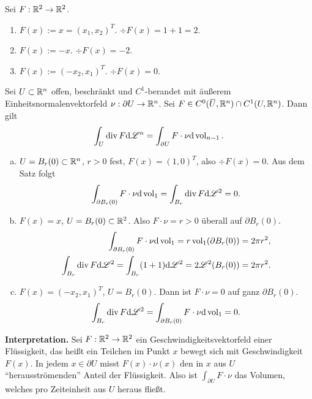 \begin{exmp} Sei $F: \mathbb{R}^2 \to \mathbb{R}^2$.
 \begin{enumerate}
  \item $F(x) := x = (x_1, x_2)^T$. $\div F(x) = 1 + 1 = 2.$
  \item $F(x) := -x$. $\div F(x) = -2$.
  \item $F(x) := (-x_2, x_1)^T$. $\div F(x) = 0$.
 \end{enumerate}
\end{exmp}

\begin{thm}[Divergenzsatz]
 Sei $U \subset \mathbb{R}^n$ offen, beschränkt und $C^1$-berandet mit äußerem Einheitsnormalenvektorfeld $\nu: \partial U \to \mathbb{R}^n$. Sei $F \in C^0( \obar{U}, \real^n ) \cap C^1( U, \real^n)$. Dann gilt
 \[ \int_U \operatorname{div} F \mathrm{d} \mathscr{L}^n = \int_{\partial U} F \cdot \nu \mathrm{d} \operatorname{vol}_{n-1}. \]
\end{thm}

\begin{exmp}
 \begin{enumerate}[a)]
  \item $U = B_r(0) \subset \mathbb{R}^n$, $r > 0$ fest, $F(x) = (1,0)^T$, also $\div F(x) = 0$. Aus dem Satz folgt
  \[ \int_{\partial B_r(0)} F \cdot \nu \mathrm{d} \operatorname{vol}_1 = \int_{B_r} \operatorname{div} F \mathrm{d} \mathscr{L}^2 = 0. \]
  \item $F(x) = x$, $U = B_r(0) \subset \mathbb{R}^2$. Also $F \cdot \nu = r > 0$ überall auf $\partial B_r(0)$.
  \[ \begin{aligned}
      \int_{\partial B_r(0)} F \cdot \nu \mathrm{d} \operatorname{vol}_1 = r \operatorname{vol}_1( \partial B_r(0) ) = 2 \pi r^2, \\
      \int_{B_r} \operatorname{div} F \mathrm{d} \mathscr{L}^2 = \int_{B_r} (1+1) \mathrm{d} \mathscr{L}^2 = 2 \mathscr{L}^2(B_r(0)) = 2 \pi r^2. 
     \end{aligned} \]
  \item $F(x) = (-x_2, x_1)^T$, $U = B_r(0)$. Dann ist $F \cdot \nu = 0$ auf ganz $\partial B_r(0)$.
  \[ \int_{B_r} \operatorname{div} F \mathrm{d} \mathscr{L}^2 = \int_{\partial B_r(0)} F \cdot \nu \mathrm{d} \operatorname{vol}_1 = 0. \]
 \end{enumerate}
\end{exmp}

\textbf{Interpretation.}
Sei $F:\mathbb{R}^2 \to \mathbb{R}^2$ ein Geschwindigkeitsvektorfeld einer Flüssigkeit, das heißt ein Teilchen im Punkt $x$ bewegt sich mit Geschwindigkeit $F(x)$. In jedem $x \in \partial U$ misst $F(x) \cdot \nu(x)$ den in $x$ aus $U$ ``herausströmenden'' Anteil der Flüssigkeit. Also ist $\int_{\partial U} F \cdot \nu$ das Volumen, welches pro Zeiteinheit aus $U$ heraus fließt.

